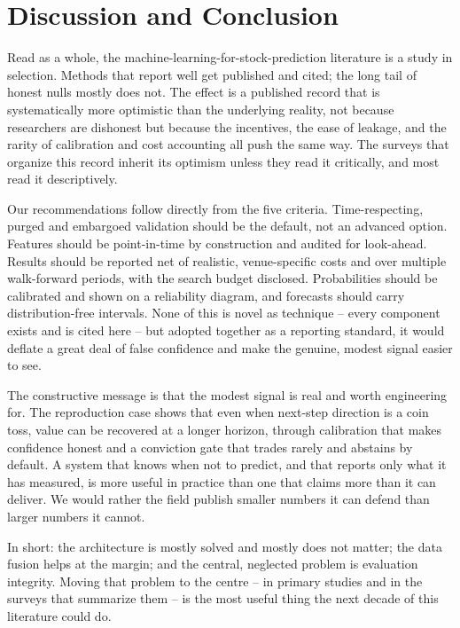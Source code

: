 \documentclass[10pt,a4paper,twocolumn]{article}
\begin{document}
\section{Discussion and Conclusion}

Read as a whole, the machine-learning-for-stock-prediction literature is a study in selection. Methods that report well get published and cited; the long tail of honest nulls mostly does not. The effect is a published record that is systematically more optimistic than the underlying reality, not because researchers are dishonest but because the incentives, the ease of leakage, and the rarity of calibration and cost accounting all push the same way. The surveys that organize this record inherit its optimism unless they read it critically, and most read it descriptively.

Our recommendations follow directly from the five criteria. Time-respecting, purged and embargoed validation should be the default, not an advanced option. Features should be point-in-time by construction and audited for look-ahead. Results should be reported net of realistic, venue-specific costs and over multiple walk-forward periods, with the search budget disclosed. Probabilities should be calibrated and shown on a reliability diagram, and forecasts should carry distribution-free intervals. None of this is novel as technique -- every component exists and is cited here -- but adopted together as a reporting standard, it would deflate a great deal of false confidence and make the genuine, modest signal easier to see.

The constructive message is that the modest signal is real and worth engineering for. The reproduction case shows that even when next-step direction is a coin toss, value can be recovered at a longer horizon, through calibration that makes confidence honest and a conviction gate that trades rarely and abstains by default. A system that knows when not to predict, and that reports only what it has measured, is more useful in practice than one that claims more than it can deliver. We would rather the field publish smaller numbers it can defend than larger numbers it cannot.

In short: the architecture is mostly solved and mostly does not matter; the data fusion helps at the margin; and the central, neglected problem is evaluation integrity. Moving that problem to the centre -- in primary studies and in the surveys that summarize them -- is the most useful thing the next decade of this literature could do.
\end{document}
